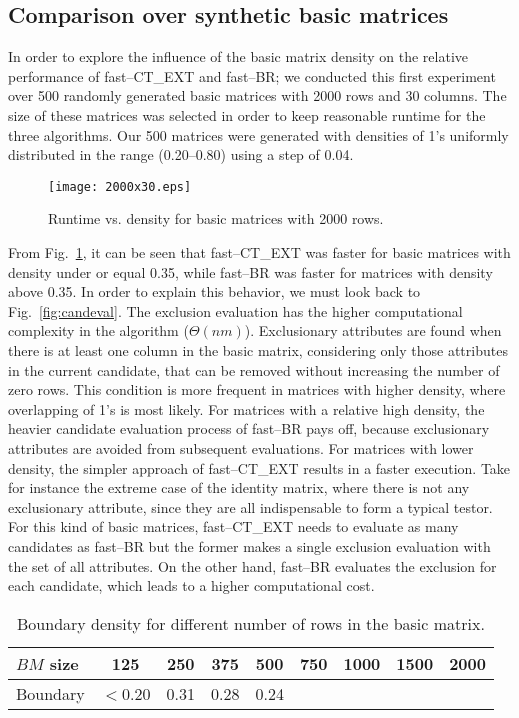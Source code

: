 \documentclass[citeauthoryear]{llncs}
\begin{document}
%
\subsection{Comparison over synthetic basic matrices}
%
In order to explore the influence of the basic matrix density on the relative performance of fast--CT\_EXT and fast--BR; we conducted this first experiment over 500 randomly generated basic matrices with 2000 rows and 30 columns. The size of these matrices was selected in order to keep reasonable runtime for the three algorithms. Our 500 matrices were generated with densities of 1's uniformly distributed in the range (0.20--0.80) using a step of 0.04. 

	\begin{figure}[htb]
	    \centering
	        \centering
	        \texttt{[image: 2000x30.eps]}	        
	        \caption{Runtime vs. density for basic matrices with 2000 rows.}
	        \label{fig:density}
	\end{figure}

From Fig.~\ref{fig:density}, it can be seen that fast--CT\_EXT was faster for basic matrices with density under or equal 0.35, while fast--BR was faster for matrices with density above 0.35. In order to explain this behavior, we must look back to Fig.~\ref{fig:candeval}. The exclusion evaluation has the higher computational complexity in the algorithm ($\Theta (nm)$). Exclusionary attributes are found when there is at least one column in the basic matrix, considering only those attributes in the current candidate, that can be removed without increasing the number of zero rows. This condition is more frequent in matrices with higher density, where overlapping of 1's is most likely. For matrices with a relative high density, the heavier candidate evaluation process of fast--BR pays off, because exclusionary attributes are avoided from subsequent evaluations. For matrices with lower density, the simpler approach of fast--CT\_EXT results in a faster execution. Take for instance the extreme case of the identity matrix, where there is not any exclusionary attribute, since they are all indispensable to form a typical testor. For this kind of basic matrices, fast--CT\_EXT needs to evaluate as many candidates as fast--BR but the former makes a single exclusion evaluation with the set of all attributes. On the other hand, fast--BR evaluates the exclusion for each candidate, which leads to a higher computational cost.

	\begin{table}[htb]
		\centering 
		\caption{Boundary density for different number of rows in the basic matrix.}
		\label{tab:boundary}
		\begin{tabular}{lcccccccc}
			\hline
			$BM$ size & 125 & 250 & 375 & 500 & 750 & 1000 & 1500 & 2000 \\
			\hline
			Boundary  & $<$0.20 & 0.31 & 0.28 & 0.24 & &&& \\		
			\hline
		\end{tabular}
	\end{table}
	
\end{document}
